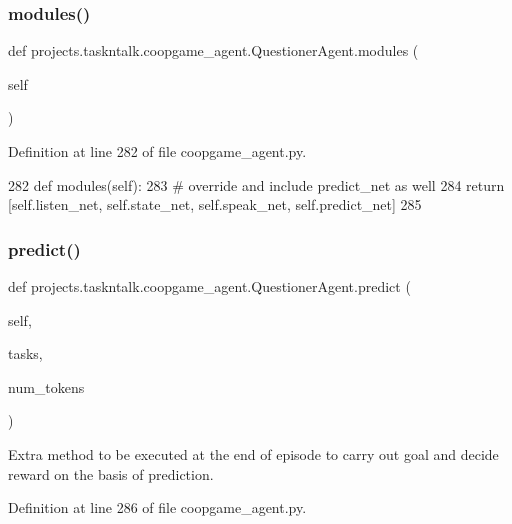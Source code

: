 \subsubsection{\texorpdfstring{modules()}{modules()}}
{\footnotesize\ttfamily def projects.\+taskntalk.\+coopgame\+\_\+agent.\+Questioner\+Agent.\+modules (\begin{DoxyParamCaption}\item[{}]{self }\end{DoxyParamCaption})}



Definition at line 282 of file coopgame\+\_\+agent.\+py.


\begin{DoxyCode}
282     \textcolor{keyword}{def }modules(self):
283         \textcolor{comment}{# override and include predict\_net as well}
284         \textcolor{keywordflow}{return} [self.listen\_net, self.state\_net, self.speak\_net, self.predict\_net]
285 
\end{DoxyCode}
\mbox{\label{classprojects_1_1taskntalk_1_1coopgame__agent_1_1QuestionerAgent_a2c8cb55fb90b14d903863caa8830996d}} 
\subsubsection{\texorpdfstring{predict()}{predict()}}
{\footnotesize\ttfamily def projects.\+taskntalk.\+coopgame\+\_\+agent.\+Questioner\+Agent.\+predict (\begin{DoxyParamCaption}\item[{}]{self,  }\item[{}]{tasks,  }\item[{}]{num\+\_\+tokens }\end{DoxyParamCaption})}

\begin{DoxyVerb}Extra method to be executed at the end of episode to carry out goal and decide
reward on the basis of prediction.
\end{DoxyVerb}
 

Definition at line 286 of file coopgame\+\_\+agent.\+py.


